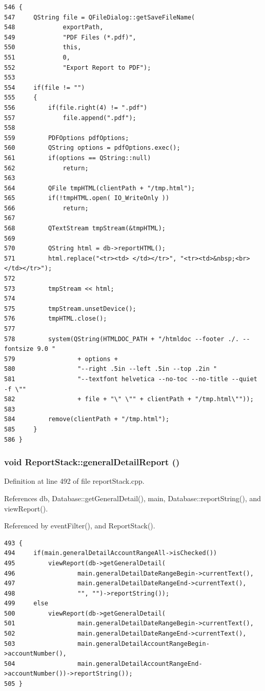 \footnotesize\begin{verbatim}546 {
547     QString file = QFileDialog::getSaveFileName(
548             exportPath,
549             "PDF Files (*.pdf)",
550             this,
551             0,
552             "Export Report to PDF");
553     
554     if(file != "")
555     {
556         if(file.right(4) != ".pdf")
557             file.append(".pdf");
558 
559         PDFOptions pdfOptions;
560         QString options = pdfOptions.exec();
561         if(options == QString::null)
562             return;
563 
564         QFile tmpHTML(clientPath + "/tmp.html");
565         if(!tmpHTML.open( IO_WriteOnly ))
566             return;
567 
568         QTextStream tmpStream(&tmpHTML);
569 
570         QString html = db->reportHTML();
571         html.replace("<tr><td> </td></tr>", "<tr><td>&nbsp;<br></td></tr>");
572 
573         tmpStream << html;
574 
575         tmpStream.unsetDevice();
576         tmpHTML.close();
577 
578         system(QString(HTMLDOC_PATH + "/htmldoc --footer ./. --fontsize 9.0 "
579                 + options +
580                 "--right .5in --left .5in --top .2in "
581                 "--textfont helvetica --no-toc --no-title --quiet -f \""
582                 + file + "\" \"" + clientPath + "/tmp.html\""));
583 
584         remove(clientPath + "/tmp.html");
585     }
586 }
\end{verbatim}\normalsize 


\hypertarget{classReportStack_k8}{
\subsubsection[generalDetailReport]{\setlength{\rightskip}{0pt plus 5cm}void Report\-Stack::general\-Detail\-Report ()}}
\label{classReportStack_k8}


Definition at line 492 of file report\-Stack.cpp.

References db, Database::get\-General\-Detail(), main, Database::report\-String(), and view\-Report().

Referenced by event\-Filter(), and Report\-Stack().

\footnotesize\begin{verbatim}493 {
494     if(main.generalDetailAccountRangeAll->isChecked())
495         viewReport(db->getGeneralDetail(
496                 main.generalDetailDateRangeBegin->currentText(),
497                 main.generalDetailDateRangeEnd->currentText(),
498                 "", "")->reportString());
499     else
500         viewReport(db->getGeneralDetail(
501                 main.generalDetailDateRangeBegin->currentText(),
502                 main.generalDetailDateRangeEnd->currentText(),
503                 main.generalDetailAccountRangeBegin->accountNumber(),
504                 main.generalDetailAccountRangeEnd->accountNumber())->reportString());
505 }
\end{verbatim}\normalsize 



